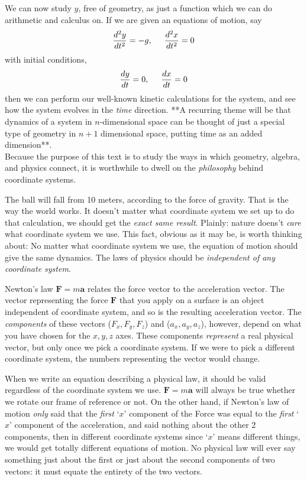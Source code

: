 	
	We can now study $y$, free of geometry, as just a function which we can do arithmetic and calculus on. If we are given an equations of motion, say 
	\begin{equation*}
		\frac{d^2y}{dt^2} = -g, \hspace{5mm} \frac{d^2x}{dt^2} = 0
	\end{equation*} 
	with initial conditions,
	\begin{equation*}
		\frac{dy}{dt}=0, \hspace{5mm} \frac{dx}{dt}=0
	\end{equation*}
	 then we can perform our well-known kinetic calculations for the system, and see how the system evolves in the \emph{time} direction. **A recurring theme will be that dynamics of a system in $n$-dimensional space can be thought of just a special type of geometry in $n+1$ dimensional space, putting time as an added dimension**.\\
	
	Because the purpose of this text is to study the ways in which geometry, algebra, and physics connect, it is worthwhile to dwell on the \emph{philosophy} behind coordinate systems.
	
	The ball will fall from 10 meters, according to the force of gravity. That is the way the world works. It doesn't matter what coordinate system we set up to do that calculation, we should get the \emph{exact same result}. Plainly: nature doens't \emph{care} what coordinate system we use. This fact, obvious as it may be, is worth thinking about: No matter what coordinate system we use, the equation of motion should give the same dynamics. The laws of physics should be \emph{independent of any coordinate system}.
	
	Newton's law $\mathbf F = m \mathbf a$ relates the force vector to the acceleration vector. The vector representing the force $\mathbf F$ that you apply on a surface is an object independent of coordinate system, and so is the resulting acceleration vector. The \emph{components} of these vectors ($F_x, F_y, F_z$) and ($a_x, a_y, a_z$), however, depend on what you have chosen for the $x,y,z$ axes. These components \emph{represent} a real physical vector, but only once we pick a coordinate system. If we were to pick a different coordinate system, the numbers representing the vector would change. 
	
	When we write an equation describing a physical law, it should be valid regardless of the coordinate system we use. $\mathbf F = m \mathbf a$ will always be true whether we rotate our frame of reference or not. On the other hand, if Newton's law of motion \emph{only} said that the \emph{first} `$x$' component of the Force was equal to the \emph{first} `$x$' component of the acceleration, and said nothing about the other $2$ components, then in different coordinate systems since `$x$' means different things, we would get totally different equations of motion. No physical law will ever say something just about the first or just about the second components of two vectors: it must equate the entirety of the two vectors. 
	
